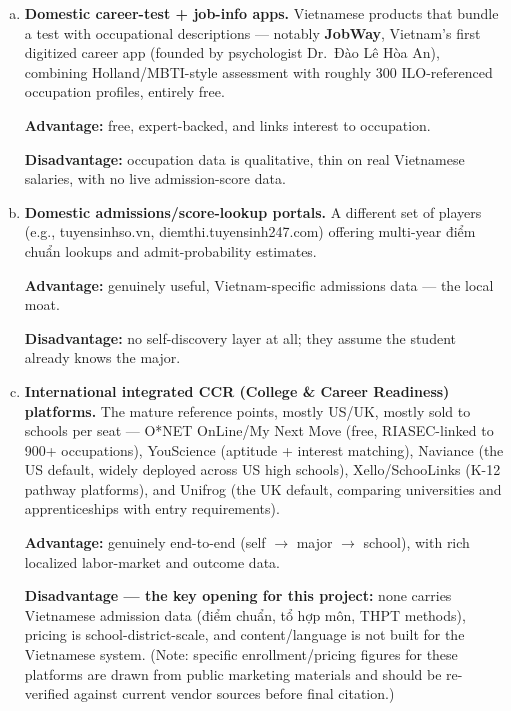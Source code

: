 \documentclass[a4paper]{article}
\begin{document}
\begin{enumerate}[a.]
    \setlength{\itemsep}{1em}
    \item \textbf{Domestic career-test + job-info apps.} Vietnamese products that bundle a test
    with occupational descriptions --- notably \textbf{JobWay}, Vietnam's first digitized
    career app (founded by psychologist Dr.\ Đào Lê Hòa An), combining Holland/MBTI-style
    assessment with roughly 300 ILO-referenced occupation profiles, entirely free.

    \par\smallskip\noindent
    \textbf{Advantage:} free, expert-backed, and links interest to occupation.

    \par\smallskip\noindent
    \textbf{Disadvantage:} occupation data is qualitative, thin on real Vietnamese salaries,
    with no live admission-score data.

    \item \textbf{Domestic admissions/score-lookup portals.} A different set of players (e.g.,
    tuyensinhso.vn, diemthi.tuyensinh247.com) offering multi-year điểm chuẩn lookups and
    admit-probability estimates.

    \par\smallskip\noindent
    \textbf{Advantage:} genuinely useful, Vietnam-specific
    admissions data --- the local moat.

    \par\smallskip\noindent
    \textbf{Disadvantage:} no self-discovery layer at all;
    they assume the student already knows the major.

    \item \textbf{International integrated CCR (College \& Career Readiness) platforms.} The
    mature reference points, mostly US/UK, mostly sold to schools per seat --- O*NET
    OnLine/My Next Move (free, RIASEC-linked to 900+ occupations), YouScience (aptitude +
    interest matching), Naviance (the US default, widely deployed across US high schools),
    Xello/SchooLinks (K-12 pathway platforms), and Unifrog (the UK default, comparing
    universities and apprenticeships with entry requirements).

    \par\smallskip\noindent
    \textbf{Advantage:} genuinely
    end-to-end (self $\rightarrow$ major $\rightarrow$ school), with rich localized
    labor-market and outcome data.

    \par\smallskip\noindent
    \textbf{Disadvantage --- the key opening for this project:}
    none carries Vietnamese admission data (điểm chuẩn, tổ hợp môn, THPT methods), pricing is
    school-district-scale, and content/language is not built for the Vietnamese system. (Note:
    specific enrollment/pricing figures for these platforms are drawn from public marketing
    materials and should be re-verified against current vendor sources before final citation.)
\end{enumerate}
\end{document}

